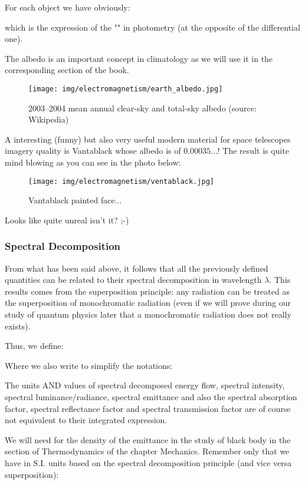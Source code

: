 	For each object we have obviously:
	
	which is the expression of the "" in photometry (at the opposite of the differential one).
	
	The albedo is an important concept in climatology as we will use it in the corresponding section of the book.
	\begin{figure}[H]
		\centering
		\texttt{[image: img/electromagnetism/earth\_albedo.jpg]}
		\caption[2003–2004 mean annual clear-sky and total-sky albedo]{2003–2004 mean annual clear-sky and total-sky albedo (source: Wikipedia)}
	\end{figure}
	
	\pagebreak
	A interesting (funny) but also very useful modern material for space telescopes imagery quality is Vantablack whose albedo is of  $0.00035$...! The result is quite mind blowing as you can see in the photo below:
	\begin{figure}[H]
		\centering
		\texttt{[image: img/electromagnetism/ventablack.jpg]}
		\caption{Vantablack painted face...}
	\end{figure}
	Looks like quite unreal isn't it? ;-)
	
	\subsubsection{Spectral Decomposition}
	From what has been said above, it follows that all the previously defined quantities can be related to their spectral decomposition in wavelength $\lambda$. This results comes from the superposition principle: any radiation can be treated as the superposition of monochromatic radiation (even if we will prove during our study of quantum physics later that a monochromatic radiation does not really exists).
	
	Thus, we define:
	
	Where we also write to simplify the notations:
	 
	\begin{tcolorbox}[title=Remark,colframe=black,arc=10pt]
	The units AND values of spectral decomposed energy flow, spectral intensity, spectral luminance/radiance, spectral emittance and also the spectral absorption factor, spectral reflectance factor and spectral transmission factor are of course not equivalent to their integrated expression.
	\end{tcolorbox}
	We will need for the density of the emittance in the study of black body in the section of Thermodynamics of the chapter Mechanics. Remember only that we have in S.I. units based on the spectral decomposition principle (and vice versa superposition):
	

